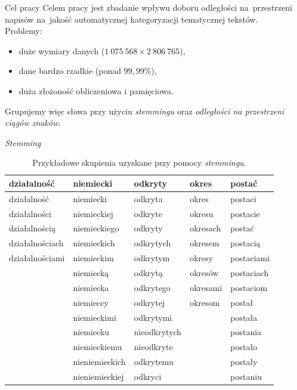 \documentclass[11pt,pdftex,mathserif]{beamer}
\theoremstyle{definition}
\begin{document}
\begin{frame}{Cel pracy}
Celem pracy jest zbadanie wpływu doboru odległości na~przestrzeni napisów na~jakość automatycznej kategoryzacji tematycznej tekstów. \\
\pause
Problemy:
\begin{itemize}
\item duże wymiary danych ($1\ 075\ 568 \times 2\ 806\ 765$),
\item dane bardzo rzadkie (ponad $99{,}99\%$),
\item duża złożoność obliczeniowa i pamięciowa.
\end{itemize}
\pause
Grupujemy więc słowa przy użyciu \emph{stemmingu} oraz \emph{odległości na przestrzeni ciągów znaków}.
\end{frame}



\begin{frame}{\emph{Stemming}}
\begin{table}[h]
\centering
\caption{Przykładowe skupienia uzyskane przy pomocy \emph{stemmingu}.}
\begin{tabular}{|lllll|}
  \hline
działalność & niemiecki & odkryty & okres & postać \\ 
  \hline
działalność & niemiecki & odkryta & okres & postaci \\ 
  działalności & niemieckiej & odkryte & okresu & postacie \\ 
  działalnością & niemieckiego & odkryty & okresach & postać \\ 
  działalnościach & niemieckich & odkrytych & okresem & postacią \\ 
  działalnościami & niemieckim & odkrytym & okresy & postaciami \\ 
   & niemiecką & odkrytą & okresów & postaciach \\ 
   & niemiecka & odkrytego & okresami & postaciom \\ 
   & niemieccy & odkrytej & okresom & postał \\ 
   & niemieckimi & odkrytymi &  & postała \\ 
   & niemiecku & nieodkrytych &  & postania \\ 
   & niemieckiemu & nieodkryte &  & postało \\ 
   & nieniemieckich & odkrytemu &  & postały \\ 
   & nieniemieckiej & odkryci &  & postaniu \\ 
   \hline
\end{tabular}
\end{table}

\end{frame}
\end{document}
